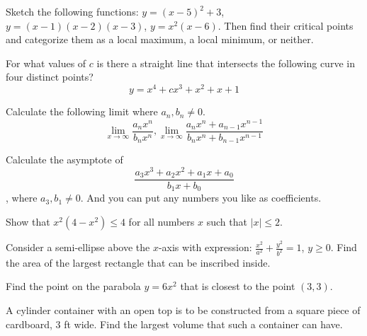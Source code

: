 \documentclass[Calculus 1 Recitation.tex]{subfiles}
\begin{document}
\begin{myleftlinebox}
	Sketch the following functions: $y=(x-5)^2+3$, $y=(x-1)(x-2)(x-3)$, $y=x^2(x-6)$. Then find their critical points and categorize them as a local maximum, a local minimum, or neither.
	\tcblower
	\vspace{2em}
\end{myleftlinebox}

\begin{myleftlinebox}
	For what values of $c$ is there a straight line that intersects the following curve in four distinct points?
	\[y=x^4+cx^3+x^2+x+1\]
	\tcblower
	\vspace{2em}
\end{myleftlinebox}

\begin{myleftlinebox}
	Calculate the following limit where $a_n,b_n\neq 0$.
	\[\lim_{x\to\infty}\frac{a_n x^n}{b_n x^n}, \lim_{x\to\infty}\frac{a_n x^n+a_{n-1} x^{n-1}}{b_n x^n+b_{n-1} x^{n-1}}\]
	\tcblower
	\vspace{2em}
\end{myleftlinebox}

\begin{myleftlinebox}
	Calculate the asymptote of 
	\[\frac{a_3 x^3+a_2 x^2+a_1 x+a_0}{b_1 x+b_0}\]
	, where $a_3,b_1\neq0$. And you can put any numbers you like as coefficients.
	\tcblower
	\vspace{2em}
\end{myleftlinebox}

\begin{myleftlinebox}
	Show that $x^2(4-x^2)\leq 4$ for all numbers $x$ such that $|x|\leq 2$.
	\tcblower
	\vspace{2em}
\end{myleftlinebox}

\begin{myleftlinebox}
	Consider a semi-ellipse above the $x$-axis with expression: $\frac{x^2}{a^2}+\frac{y^2}{b^2}=1$, $y\geq 0$. Find the area of the largest rectangle that can be inscribed inside.
	\tcblower
	\vspace{2em}
\end{myleftlinebox}

\begin{myleftlinebox}
	Find the point on the parabola $y=6x^2$ that is closest to the point $(3,3)$.
	\tcblower
	\vspace{2em}
\end{myleftlinebox}

\begin{myleftlinebox}
	A cylinder container with an open top is to be constructed from a square piece of cardboard, 3 ft wide. Find the largest volume that such a container can have.
	\tcblower
	\vspace{2em}
\end{myleftlinebox}
\end{document}
